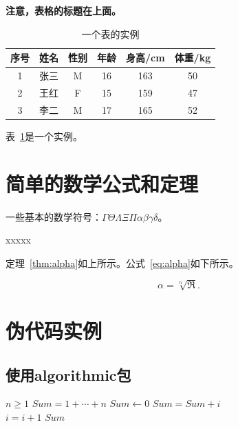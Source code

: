 \textbf{注意，表格的标题在上面。}
\begin{table}[!ht]
\centering
\caption{一个表的实例}
\begin{tabular}{cccccc}
    \toprule
    序号 & 姓名 & 性别 & 年龄 & 身高/cm & 体重/kg \\
    \midrule
    1 & 张三 & M & 16 & 163 & 50 \\
    2 & 王红 & F & 15 & 159 & 47 \\
    3 & 李二 & M & 17 & 165 & 52 \\
    \bottomrule
\end{tabular}
\label{tab:tabobj}
\end{table}
表~\ref{tab:tabobj}是一个实例。


\section{简单的数学公式和定理}

一些基本的数学符号：$\Gamma\Theta\Lambda\Xi\Pi\alpha\beta\gamma\delta$。

\begin{theo} [存在性定理]
\label{thm:alpha}
    xxxxx
\end{theo}

定理~\ref{thm:alpha}如上所示。公式~\ref{eq:alpha}如下所示。

\begin{equation}
\label{eq:alpha}
    \alpha=\sqrt[n]{\Re}.
\end{equation}


\section{伪代码实例}

\subsection{使用algorithmic包}

\begin{algorithm}[!ht]
\caption{algorithmic示例}
\begin{algorithmic}[1] %
    \REQUIRE $n \geq 1$                  %
    \ENSURE $Sum = 1 + \cdots + n$       %
    \STATE $Sum \leftarrow 0$            %
    \ELSE
            \STATE $Sum = Sum + i$\\
            \STATE $i = i + 1$
        \ENDFOR
    \ENDIF
    \RETURN $Sum$
\end{algorithmic}
\label{alg}
\end{algorithm}

